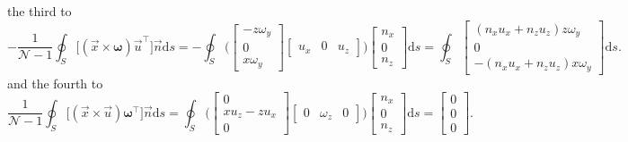 \documentclass[wes, manuscript]{copernicus}
\begin{document}
%
the third to
%
\begin{equation}
-\frac{1}{\mathscr{N}-1} \oint_{S} \big[(\vec{x} \times \boldsymbol{\omega})\vec{u}^{\top}\big]\vec{n}  \textrm{d}s
= - \oint_{S}
\Bigg(
\begin{bmatrix} -z\omega_{y} \\[2pt] 0 \\[2pt] x\omega_{y} \end{bmatrix}
\begin{bmatrix} u_{x} & 0 & u_{z} \end{bmatrix} 
\Bigg)
\begin{bmatrix} n_{x} \\[2pt] 0 \\[2pt] n_{z} \end{bmatrix} \textrm{d}s
= \oint_{S}
\begin{bmatrix}
(n_{x}u_{x}+n_{z}u_{z}) z \omega_{y} \\[4pt]
0 \\[4pt]
-(n_{x}u_{x}+n_{z}u_{z}) x \omega_{y}
\end{bmatrix} \textrm{d}s .
\end{equation}
%
and the fourth to
%
\begin{equation}
\frac{1}{\mathscr{N}-1} \oint_{S} \big[(\vec{x} \times \vec{u})\boldsymbol{\omega}^{\top}\big]\vec{n}  \textrm{d}s
=   \oint_{S}
\Bigg(
\begin{bmatrix} 0 \\ x u_{{z}} - z u_{{x}} \\ 0 \end{bmatrix}
\begin{bmatrix} 0 & \omega_{z} & 0 \end{bmatrix}
\Bigg)
\begin{bmatrix} n_{{x}} \\ 0 \\ n_{{z}} \end{bmatrix} \textrm{d}s
= \begin{bmatrix} 0 \\ 0 \\ 0 \end{bmatrix} .
\end{equation}
\end{document}
